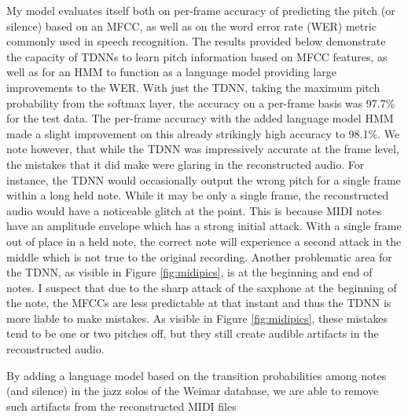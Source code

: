 \documentclass[conference]{IEEEtran}
\begin{document}
My model evaluates itself both on per-frame accuracy of predicting the pitch (or silence) based on an MFCC, as well as on the word error rate (WER) metric commonly used in speech recognition. The results provided below demonstrate the capacity of TDNNs to learn pitch information based on MFCC features, as well as for an HMM to function as a language model providing large improvements to the WER. With just the TDNN, taking the maximum pitch probability from the softmax layer, the accuracy on a per-frame basis was 97.7\% for the test data. The per-frame accuracy with the added language model HMM made a slight improvement on this already strikingly high accuracy to 98.1\%. We note however, that while the TDNN was impressively accurate at the frame level, the mistakes that it did make were glaring in the reconstructed audio. For instance, the TDNN would occasionally output the wrong pitch for a single frame within a long held note. While it may be only a single frame, the reconstructed audio would have a noticeable glitch at the point. This is because MIDI notes have an amplitude envelope which has a strong initial attack. With a single frame out of place in a held note, the correct note will experience a second attack in the middle which is not true to the original recording. Another problematic area for the TDNN, as visible in Figure \ref{fig:midipics}, is at the beginning and end of notes. I suspect that due to the sharp attack of the saxphone at the beginning of the note, the MFCCs are less predictable at that instant and thus the TDNN is more liable to make mistakes. As visible in Figure \ref{fig:midipics}, these mistakes tend to be one or two pitches off, but they still create audible artifacts in the reconstructed audio.

By adding a language model based on the transition probabilities among notes (and silence) in the jazz solos of the Weimar database, we are able to remove such artifacts from the reconstructed MIDI files 
\end{document}

